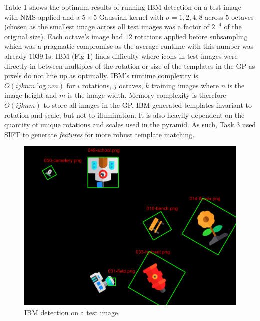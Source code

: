 \documentclass[11pt]{article}
\begin{document}
\begin{multicols}{2}
Table 1 shows the optimum results of running IBM detection on a test image with NMS applied and a $5\times5$ Gaussian kernel with $\sigma=1,2,4,8$ across $5$ octaves (chosen as the smallest image across all test images was a factor of $2^{-4}$ of the original size). Each octave's image had $12$ rotations applied before subsampling which was a pragmatic compromise as the average runtime with this number was already $1039.1$s.  IBM (Fig 1) finds difficulty where icons in test images were directly in-between multiples of the rotation or size of the templates in the GP as pixels do not line up as optimally. IBM's runtime complexity is $O(ijk nm\log nm)$ for $i$ rotations, $j$ octaves, $k$ training images where $n$ is the image height and $m$ is the image width. Memory complexity is therefore $O(ijknm)$ to store all images in the GP. IBM generated templates invariant to rotation and scale, but not to illumination. It is also heavily dependent on the quantity of unique rotations and scales used in the pyramid. As such, Task 3 used SIFT to generate \textit{features} for more robust template matching.

\setlength\abovedisplayskip{0pt}
\setlength\belowdisplayskip{0pt}
\begin{table}[H]
\begin{center}
\label{tbl:t2results}\caption{TP, FP, ACC Results and Runtime for Task 2.}
\end{center}
\end{table}
\vspace*{-\baselineskip}
\normalsize

\setlength\abovedisplayskip{0pt}
\setlength\belowdisplayskip{0pt}
\begin{figure}[H]
\centering
\includegraphics[width=0.65\linewidth]{img/IBM.png} 
\caption{IBM detection on a test image.}\label{fig:IBM}
\end{figure}
\vspace*{-\baselineskip}


\end{multicols}
\end{document}
